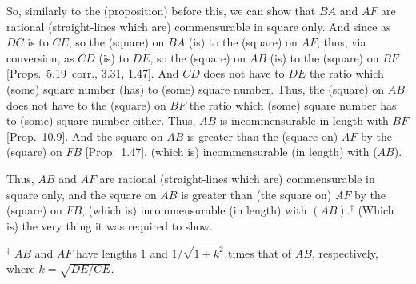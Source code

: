 \begin{Parallel}{}{}
{So, similarly to the (proposition) before this, we can show that $BA$ and
$AF$ are rational (straight-lines which are) commensurable in square only.
And since as $DC$ is to $CE$, so the (square) on $BA$ (is) to the (square)
on $AF$, thus, via conversion, as $CD$ (is) to $DE$, so the (square) on
$AB$ (is) to the (square) on $BF$ [Props.~5.19~corr., 3.31, 1.47]. And
$CD$ does not have to $DE$ the ratio which (some) square number
(has) to (some) square number. Thus, the (square) on $AB$
does not have to the (square) on $BF$ the ratio which (some)
square number has to (some) square number either. Thus, $AB$ is
incommensurable in length with $BF$ [Prop.~10.9].
And the square on $AB$ is greater than the (square on) $AF$ by the
(square) on $FB$  [Prop.~1.47], (which is) incommensurable (in length) with ($AB$).

Thus, $AB$ and $AF$ are rational (straight-lines which are) commensurable
in square only, and the square on $AB$ is greater than (the square on) $AF$
by the (square) on $FB$, (which is) incommensurable (in length) with
 $(AB)$.$^\dag$ (Which is) the very thing it was required to show.}
\end{Parallel}
{\footnotesize\noindent$^\dag$ $AB$ and $AF$ have lengths $1$ and $1/\sqrt{1+k^2}$
times that of $AB$, respectively, where $k=\sqrt{DE/CE}$.}

